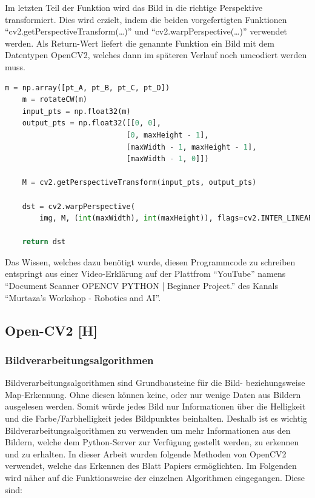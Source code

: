 Im letzten Teil der Funktion wird das Bild in die richtige Perspektive transformiert. Dies wird erzielt, indem die beiden vorgefertigten Funktionen ``cv2.getPerspectiveTransform(\dots)'' und ``cv2.warpPerspective(\dots)'' verwendet werden. Als Return-Wert liefert die genannte Funktion ein Bild mit dem Datentypen OpenCV2, welches dann im späteren Verlauf noch umcodiert werden muss.

\begin{lstlisting}[language=Python,label=lst:impl:wrapPerspective,firstnumber=40]
    m = np.array([pt_A, pt_B, pt_C, pt_D])
    m = rotateCW(m)
    input_pts = np.float32(m)
    output_pts = np.float32([[0, 0],
                            [0, maxHeight - 1],
                            [maxWidth - 1, maxHeight - 1],
                            [maxWidth - 1, 0]])

    M = cv2.getPerspectiveTransform(input_pts, output_pts)

    dst = cv2.warpPerspective(
        img, M, (int(maxWidth), int(maxHeight)), flags=cv2.INTER_LINEAR)

    return dst
\end{lstlisting}

Das Wissen, welches dazu benötigt wurde, diesen Programmcode zu schreiben entspringt aus einer Video-Erklärung auf der Plattfrom ``YouTube'' namens ``Document Scanner OPENCV PYTHON | Beginner Project.'' des Kanals ``Murtaza's Workshop - Robotics and AI''. \cite{maai:documentscannerYoutube:cite}

\subsection{Open-CV2 [H]}
\subsubsection{Bildverarbeitungsalgorithmen} \label{maai:alogs}

Bildverarbeitungsalgorithmen sind Grundbausteine für die Bild- beziehungsweise Map-Erkennung. Ohne diesen können keine, oder nur wenige Daten aus Bildern ausgelesen werden. Somit würde jedes Bild nur Informationen über die Helligkeit und die Farbe/Farbhelligkeit jedes Bildpunktes beinhalten. Deshalb ist es wichtig Bildverarbeitungsalgorithmen zu verwenden um mehr Informationen aus den Bildern, welche dem Python-Server zur Verfügung gestellt werden, zu erkennen und zu erhalten. In dieser Arbeit wurden folgende Methoden von OpenCV2 verwendet, welche das Erkennen des Blatt Papiers ermöglichten. Im Folgenden wird näher auf die Funktionsweise der einzelnen Algorithmen eingegangen. Diese sind:

